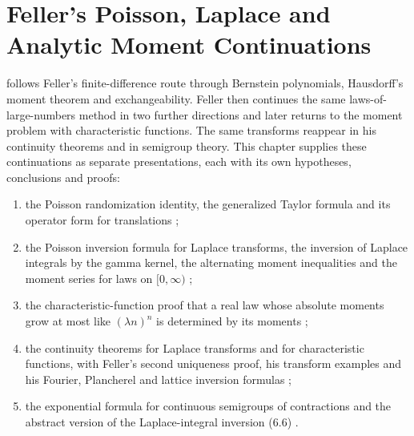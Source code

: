 \chapter{Feller's Poisson, Laplace and Analytic Moment Continuations}
\label{sec:p15-w02b-p15-012-feller-continuations}

 follows Feller's finite-difference
route through Bernstein polynomials, Hausdorff's moment theorem and
exchangeability. Feller then continues the same laws-of-large-numbers method
in two further directions and later returns to the moment problem with
characteristic functions. The same transforms reappear in his continuity
theorems and in semigroup theory. This chapter supplies these continuations as
separate presentations, each with its own hypotheses, conclusions and proofs:
\begin{enumerate}
\item the Poisson randomization identity, the generalized Taylor formula and
      its operator form for translations
      \cite[vol.~II, VII.5, pp.~230--232]{Feller1971ProbabilityII};
\item the Poisson inversion formula for Laplace transforms, the inversion of
      Laplace integrals by the gamma kernel, the alternating moment
      inequalities and the moment series for laws on \([0,\infty)\)
      \cite[vol.~II, VII.6, pp.~232--234]{Feller1971ProbabilityII};
\item the characteristic-function proof that a real law whose absolute moments
      grow at most like \((\lambda n)^n\) is determined by its moments
      \cite[vol.~II, XV.4, pp.~512--515]{Feller1971ProbabilityII};
\item the continuity theorems for Laplace transforms and for characteristic
      functions, with Feller's second uniqueness proof, his transform examples and his Fourier, Plancherel and lattice inversion formulas \cite[vol.~II, XIII.1, pp.~429--434; XV.2, pp.~504--505; XV.3, pp.~507--511]{Feller1971ProbabilityII};
\item the exponential formula for continuous semigroups of contractions and
      the abstract version of the Laplace-integral inversion (6.6)
      \cite[vol.~II, X.8--X.9, pp.~350--355; XIII.9--XIII.10, pp.~454--463]{Feller1971ProbabilityII}.
\end{enumerate}

